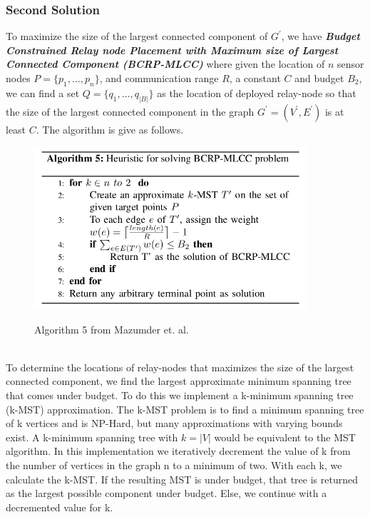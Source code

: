 \documentclass{article}
\begin{document}
\subsubsection*{Second Solution}
To maximize the size of the largest connected component of $G^\prime$, we have \textbf{\textit{Budget Constrained Relay node Placement with Maximum size of Largest Connected Component (BCRP-MLCC)}} where given the location of $n$ sensor nodes $P=\{p_1, \hdots, p_n\}$, and communication range $R$, a constant $C$ and budget $B_2$, we can find a set $Q=\{q_1, \hdots, q_{|B|}\}$ as the location of deployed relay-node so that the size of the largest connected component in the graph $G^\prime=(V^\prime, E^\prime)$ is at least $C$. The algorithm is give as follows.
\begin{figure}[h]
\centering
\includegraphics[width=0.9\textwidth]{Alg5.png}
\label{alg5}
\caption{Algorithm 5 from Mazumder et. al.}
\end{figure}\\

To determine the locations of relay-nodes that maximizes the size of the largest connected component, we find the largest approximate minimum spanning tree that comes under budget. To do this we implement a k-minimum spanning tree (k-MST) approximation. The k-MST problem is to find a minimum spanning tree of k vertices and is NP-Hard, but many approximations with varying bounds exist. A k-minimum spanning tree with $k = \left|V\right|$ would be equivalent to the MST algorithm. In this implementation we iteratively decrement the value of k from the number of vertices in the graph n to a minimum of two. With each k, we calculate the k-MST. If the resulting MST is under budget, that tree is returned as the largest possible component under budget. Else, we continue with a decremented value for k.
\end{document}

